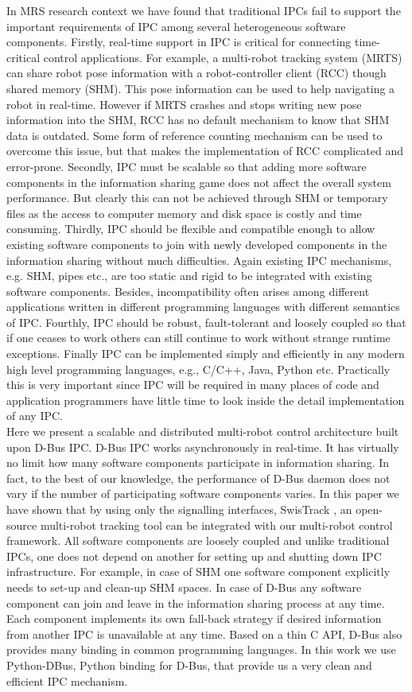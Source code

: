 \documentclass{ifacconf}
\begin{document}
In MRS research context we have found that traditional IPCs fail to support the important requirements of IPC among several heterogeneous software components. Firstly, real-time support in IPC is critical for connecting time-critical control applications. For example, a multi-robot tracking system (MRTS) can share robot pose information with a robot-controller client (RCC) though shared memory (SHM). This pose information can be used to help navigating a robot in real-time.  However if  MRTS crashes and stops writing new pose information into the SHM, RCC has no default mechanism to know that SHM data is outdated. Some form of reference counting mechanism can be used to overcome this issue, but that makes the implementation of RCC complicated and error-prone. Secondly, IPC must be scalable so that adding more software components in the information sharing game does not affect the overall system performance. But clearly this can not be  achieved through SHM or temporary files as the access to computer memory and disk space is costly and time consuming. Thirdly, IPC should be flexible and compatible enough to allow existing software components  to join with newly developed components in the information sharing without much difficulties. Again existing IPC mechanisms, e.g. SHM, pipes etc., are too static and rigid to be integrated with existing software components. Besides, incompatibility often arises among different applications written in different programming languages with different semantics of IPC. Fourthly, IPC should be robust, fault-tolerant and loosely coupled so that if one ceases to work others can still continue to work without strange runtime exceptions. Finally IPC can be implemented simply and efficiently in any modern high level programming languages, e.g., C/C++, Java, Python etc. Practically this is very important since IPC will be required in many places of code and application programmers have little time to look inside the detail implementation of any IPC.\\
Here we present a scalable and distributed multi-robot control architecture built upon D-Bus IPC.  D-Bus IPC  works asynchronously in real-time. It has virtually no limit how many software components participate in information sharing. In fact, to the best of our knowledge,  the performance of D-Bus daemon does not vary if the number of participating software components varies. In this paper we have shown that by using only the signalling interfaces, SwisTrack \cite{xxx}, an open-source multi-robot tracking tool can be integrated with our multi-robot control framework. All software components are loosely coupled  and unlike traditional IPCs, one does not depend on another for setting up and shutting down IPC infrastructure. For example, in case of SHM one software component explicitly needs to set-up and clean-up SHM spaces. In case of D-Bus any  software component can join and leave in the information sharing process at any time. Each component  implements its own fall-back strategy if desired information from another IPC is unavailable at any time. Based on a thin C API, D-Bus also provides many binding in common programming languages. In this work we use Python-DBus, Python binding for D-Bus, that provide us a very clean and efficient IPC mechanism.
\end{document}
